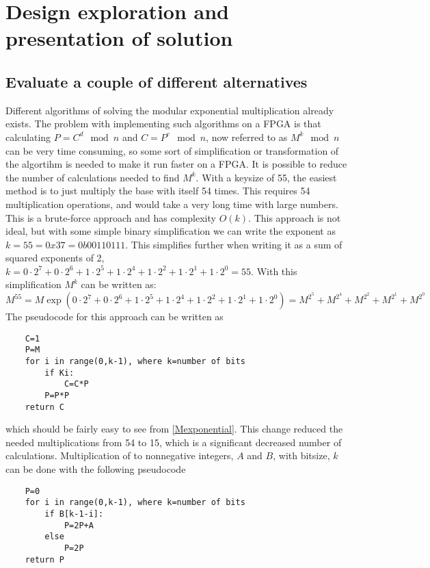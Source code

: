 \section{Design exploration and presentation of solution}
\subsection{Evaluate a couple of different alternatives}\label{sec:differentAlternatives}
Different algorithms of solving the modular exponential multiplication already exists. The problem with implementing such algorithms on a FPGA is that calculating $P=C^d\mod{n}$ and $C=P^e\mod{n}$, now referred to as $M^k\mod{n}$ can be very time consuming, so some sort of simplification or transformation of the algortihm is needed to make it run faster on a FPGA. It is possible to reduce the number of calculations needed to find $M^k$. With a keysize of 55, the easiest method is to just multiply the base with itself 54 times. This requires 54 multiplication operations, and would take a very long time with large numbers. This is a brute-force approach and has complexity $O(k)$. This approach is not ideal, but with some simple binary simplification we can write the exponent as $k=55=0x37=0b00110111$. This simplifies further when writing it as a sum of squared exponents of 2, $k=0\cdot2^7 + 0\cdot2^6 + 1\cdot2^5 + 1\cdot2^4 + 1\cdot2^2 + 1\cdot2^1 + 1\cdot2^0=55$. With this simplification $M^k$ can be written as:
%
\begin{equation}\label{Mexponential}
    M^{55}=M\exp(0\cdot2^7 + 0\cdot2^6 + 1\cdot2^5 + 1\cdot2^4 + 1\cdot2^2 + 1\cdot2^1 + 1\cdot2^0) 
    = M^{2^5} + M^{2^4} + M^{2^2} + M^{2^1} + M^{2^0} 
\end{equation}
%
The pseudocode for this approach can be written as
%
\begin{lstlisting}
    C=1
    P=M
    for i in range(0,k-1), where k=number of bits
        if Ki:
            C=C*P
        P=P*P
    return C
\end{lstlisting}
%
which should be fairly easy to see from \cref{Mexponential}. This change reduced the needed multiplications from 54 to 15, which is a significant decreased number of calculations.
Multiplication of to nonnegative integers, $A$ and $B$, with bitsize, $k$ can be done with the following pseudocode
%
\begin{lstlisting}
    P=0
    for i in range(0,k-1), where k=number of bits
        if B[k-1-i]:
            P=2P+A
        else
            P=2P
    return P
\end{lstlisting}
